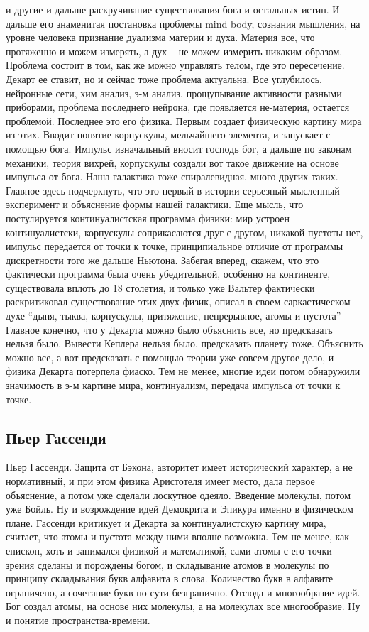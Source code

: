 \documentclass[a4paper, 12pt]{article}
\begin{document}
и другие и дальше раскручивание существования бога и остальных истин. 
И дальше его знаменитая постановка проблемы mind body, сознания 
мышления, на уровне человека признание дуализма материи и духа. Материя 
все, что протяженно и можем измерять, а дух -- не можем измерить никаким 
образом. Проблема состоит в том, как же можно управлять телом, где это 
пересечение. Декарт ее ставит, но и сейчас тоже проблема актуальна. Все 
углубилось, нейронные сети, хим анализ, э-м анализ, прощупывание 
активности разными приборами, проблема последнего нейрона, где 
появляется не-материя, остается проблемой. Последнее это его физика. 
Первым создает физическую картину мира из этих. Вводит понятие 
корпускулы, мельчайшего элемента, и запускает с помощью бога. Импульс 
изначальный вносит господь бог, а дальше по законам механики, теория 
вихрей, корпускулы создали вот такое движение на основе импульса от 
бога. Наша галактика тоже спиралевидная, много других таких. Главное 
здесь подчеркнуть, что это первый в истории серьезный мысленный 
эксперимент и объяснение формы нашей галактики. Еще мысль, что 
постулируется континуалистская программа физики: мир устроен 
континуалистски, корпускулы соприкасаются друг с другом, никакой пустоты 
нет, импульс передается от точки к точке, принципиальное отличие от 
программы дискретности того же дальше Ньютона. Забегая вперед, скажем, 
что это фактически программа была очень убедительной, особенно на 
континенте, существовала вплоть до 18 столетия, и только уже Вальтер 
фактически раскритиковал существование этих двух физик, описал в своем 
саркастическом духе ``дыня, тыква, корпускулы, притяжение, непрерывное, 
атомы и пустота'' Главное конечно, что у Декарта можно было объяснить 
все, но предсказать нельзя было. Вывести Кеплера нельзя было, 
предсказать планету тоже. Объяснить можно все, а вот предсказать 
с помощью теории уже совсем другое дело, и физика Декарта потерпела 
фиаско. Тем не менее, многие идеи потом обнаружили значимость в э-м 
картине мира, континуализм, передача импульса от точки к точке.


\subsection{Пьер Гассенди}

Пьер Гассенди. Защита от Бэкона, авторитет имеет исторический характер, 
а не нормативный, и при этом физика Аристотеля имеет место, дала первое 
объяснение, а потом уже сделали лоскутное одеяло. Введение молекулы, 
потом уже Бойль. Ну и возрождение идей Демокрита и Эпикура именно 
в физическом плане. Гассенди критикует и Декарта за континуалистскую 
картину мира, считает, что атомы и пустота между ними вполне возможна. 
Тем не менее, как епископ, хоть и занимался физикой и математикой, сами 
атомы с его точки зрения сделаны и порождены богом, и складывание атомов 
в молекулы по принципу складывания букв алфавита в слова. Количество 
букв в алфавите ограничено, а сочетание букв по сути безгранично. Отсюда 
и многообразие идей. Бог создал атомы, на основе них молекулы, а на 
молекулах все многообразие. Ну и понятие пространства-времени.
\end{document}
